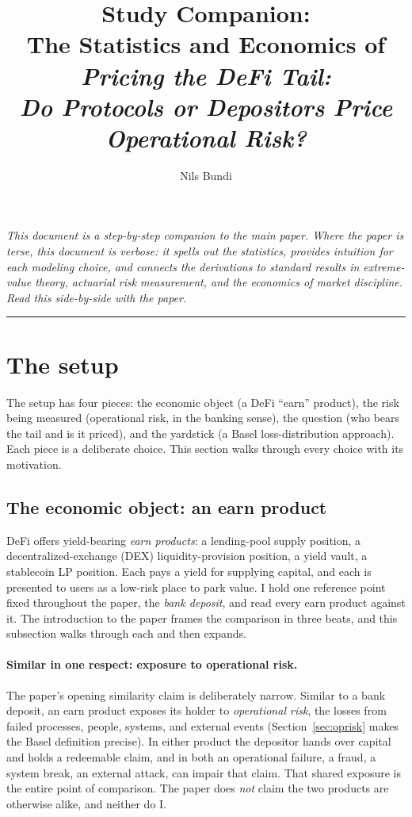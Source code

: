 \documentclass[11pt]{article}
\title{Study Companion: \\
The Statistics and Economics of\\
\emph{Pricing the DeFi Tail:\\ Do Protocols or Depositors Price Operational Risk?}}
\author{Nils Bundi}
\date{}
\theoremstyle{definition}
\theoremstyle{remark}
\theoremstyle{definition}
\newcommand{\1}{\mathbf{1}}
\begin{document}
\maketitle
\tableofcontents
\vspace{1em}

\noindent\textit{This document is a step-by-step companion to the main paper.
Where the paper is terse, this document is verbose: it spells out the
statistics, provides intuition for each modeling choice, and connects the
derivations to standard results in extreme-value theory, actuarial risk
measurement, and the economics of market discipline. Read this side-by-side
with the paper.}

\bigskip
\hrule
\bigskip

\section{The setup}\label{sec:setup}

The setup has four pieces: the economic object (a DeFi ``earn'' product), the
risk being measured (operational risk, in the banking sense), the question
(who bears the tail and is it priced), and the yardstick (a Basel
loss-distribution approach). Each piece is a deliberate choice. This section
walks through every choice with its motivation.

\subsection{The economic object: an earn product}

DeFi offers yield-bearing \emph{earn products}: a lending-pool supply position,
a decentralized-exchange (DEX) liquidity-provision position, a yield vault, a
stablecoin LP position. Each pays a yield for supplying capital, and each is
presented to users as a low-risk place to park value. I hold one reference
point fixed throughout the paper, the \emph{bank deposit}, and read every earn
product against it. The introduction to the paper frames the comparison in three
beats, and this subsection walks through each and then expands.

\paragraph{Similar in one respect: exposure to operational risk.}
The paper's opening similarity claim is deliberately narrow. Similar to a bank
deposit, an earn product exposes its holder to \emph{operational risk}, the
losses from failed processes, people, systems, and external events
(Section~\ref{sec:oprisk} makes the Basel definition precise). In either product
the depositor hands over capital and holds a redeemable claim, and in both an
operational failure, a fraud, a system break, an external attack, can impair that
claim. That shared exposure is the entire point of comparison. The paper does
\emph{not} claim the two products are otherwise alike, and neither do I.
\end{document}
